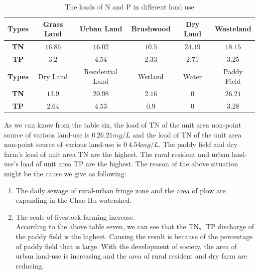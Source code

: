 \documentclass[12pt,a4paper]{article}
\begin{document}
\begin{table}[H] \renewcommand\arraystretch{1.5}
    \begin{center}
        \caption{\footnotesize {The loads of N and P in different land use  }}
        \begin{footnotesize}
            \begin{tabular}{cccccc}\toprule[1pt]
                \bf Types&Grass Land&Urban Land&Brushwood&Dry Land&Wasteland           \\\hline
                \bf TN   &$16.86$     &$16.02$           &$10.5$   &$24.19$&$18.15$    \\
                \bf TP   &$3.2$       &$4.54$            &$2.33$   &$2.71$ &$3.25$   \\  \hline
                \bf Types&Dry Land  &Residential Land    &Wetland  &Water  &Paddy Field        \\
                \bf TN   &$13.9$      &$20.98$           &$2.16$   &$0$    &$26.21$    \\
                \bf TP   &$2.64$      &$4.53$            &$0.9$    &$0$    &$3.28$     \\\bottomrule[1pt]
            \end{tabular}
        \end{footnotesize}
    \end{center}
\end{table}
\vspace{-0.5cm}
As we can know from the table six, the load of TN of the unit area non-point source of various land-use is $0~26.21mg/L$ and the load of TN of the unit area non-point source of various land-use is $0~4.54mg/L$. The paddy field and dry farm's load of unit area TN are the highest. The rural resident and urban land-use's load of unit area TP are the highest. The reason of the above situation might be the cause we give as following:
\begin{enumerate}
    \item The daily sewage of rural-urban fringe zone and the area of plow are expanding in the Chao Hu watershed.
    \item The scale of livestock farming increase.\\
    According to the above table seven, we can see that the TN、TP discharge of the paddy field is the highest. Causing the result is because of the percentage of paddy field that is large. With the development of society, the area of urban land-use is increasing and the area of rural resident and dry farm are reducing.
    
\end{enumerate}
\par
\end{document}
